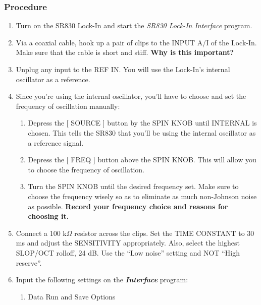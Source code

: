 \documentclass{../lab}
\begin{document}
\subsubsection{Procedure}

\begin{enumerate}
    \item Turn on the SR830 Lock-In and start the \emph{SR830 Lock-In Interface} program.

    \item Via a coaxial cable, hook up a pair of clips to the INPUT A/I of the Lock-In. Make sure that the cable is short and stiff. \textbf{Why is this important?}

    \item Unplug any input to the REF IN. You will use the Lock-In's internal oscillator as a reference.

    \item Since you're using the internal oscillator, you'll have to choose and set the frequency of oscillation manually:
    \begin{enumerate}
        \item Depress the [ SOURCE ] button by the SPIN KNOB until INTERNAL is chosen. This tells the SR830 that you'll be using the internal oscillator as a reference signal.

        \item Depress the [ FREQ ] button above the SPIN KNOB. This will allow you to choose the frequency of oscillation.

        \item Turn the SPIN KNOB until the desired frequency set. Make sure to choose the frequency wisely so as to eliminate as much non-Johnson noise as possible. \textbf{Record your frequency choice and reasons for choosing it.}

    \end{enumerate}

    \item Connect a 100 k$\Omega$ resistor across the clips. Set the TIME CONSTANT to 30 ms and adjust the SENSITIVITY appropriately. Also, select the highest SLOP/OCT rolloff, 24 dB. Use the ``Low noise'' setting and NOT ``High reserve''.

    \item Input the following settings on the \emph{\textbf{Interface}} program:
    \begin{enumerate}
        \item Data Run and Save Options


\end{enumerate}
\end{enumerate}
\end{document}
